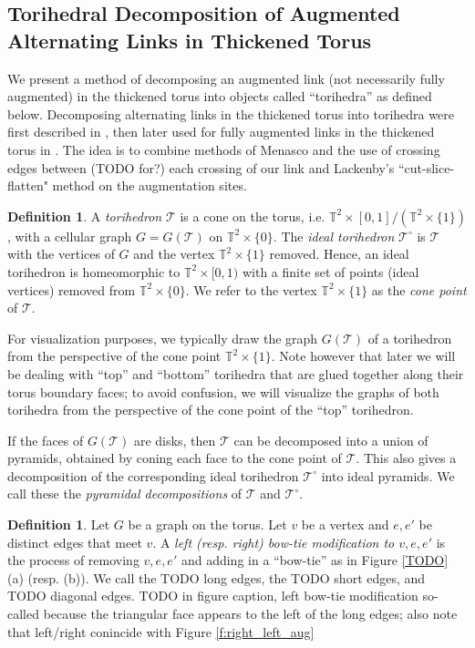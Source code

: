 \documentclass[11pt]{amsart}
\newcommand{\torus}{{\mathbb{T}^2}}
\newcommand{\sT}{{\mathcal{T}}}
\theoremstyle{plain}
\theoremstyle{definition}
\newtheorem{define}[theorem]{Definition}
\newtheorem{definition}[theorem]{Definition}
\begin{document}
\subsection{Torihedral Decomposition of Augmented Alternating Links in Thickened Torus}


We present a method of decomposing an augmented link
(not necessarily fully augmented) in the thickened torus into
objects called ``torihedra'' as defined below.
Decomposing alternating links in the thickened torus into 
torihedra were first described in \cite{CKP2},
then later used for fully augmented links in 
the thickened torus in \cite{kwon2020fully}.
The idea is to combine methods of Menasco
\cite{Menasco} and the use of crossing edges
between (TODO for?) each crossing of our link
and Lackenby's ``cut-slice-flatten" method \cite{lackenby}
on the augmentation
sites.



\begin{define}\cite{CKP2}
\label{def:torihedron}
A \emph{torihedron} $\sT$ is a cone on the torus, 
i.e. $\torus \times [0,1]/(\torus \times \{1\})$, with a cellular graph
$G = G(\sT)$ on $\torus \times \{0\}$.
The \emph{ideal torihedron} $\sT^\circ$ is $\sT$ with the
vertices of $G$ and the vertex $\torus \times \{1\}$ removed. Hence, an ideal
torihedron is homeomorphic to $\torus \times [0,1)$ with a finite set of points
(ideal vertices) removed from $\torus \times \{0\}$.
We refer to the vertex $\torus \times \{1\}$ as the \emph{cone point}
of $\sT$.
\end{define}


For visualization purposes, we typically draw the graph $G(\sT)$ of a
torihedron from the perspective of the cone point $\torus \times \{1\}$.
Note however that later we will be dealing with
``top'' and ``bottom'' torihedra that are glued together
along their torus boundary faces;
to avoid confusion, we will visualize the graphs of both torihedra
from the perspective of the cone point of the ``top'' torihedron.


If the faces of $G(\sT)$ are disks,
then $\sT$ can be decomposed into a union of pyramids,
obtained by coning each face to the cone point of $\sT$.
This also gives a decomposition of the corresponding ideal torihedron
$\sT^\circ$ into ideal pyramids.
We call these the \emph{pyramidal decompositions} of $\sT$ and $\sT^\circ$.


\begin{definition}
Let $G$ be a graph on the torus.
Let $v$ be a vertex and $e,e'$ be distinct edges that meet $v$.
A \emph{left (resp. right) bow-tie modification to $v,e,e'$}
is the process of removing $v,e,e'$ and adding in a ``bow-tie''
as in Figure \ref{TODO} (a) (resp. (b)).
We call the TODO long edges, the TODO short edges,
and TODO diagonal edges.
TODO in figure caption, left bow-tie modification so-called because
the triangular face appears to the left of the long edges;
also note that left/right conincide with Figure \ref{f:right_left_aug}
\label{d:diagram-bowtie}
\end{definition}
\end{document}
